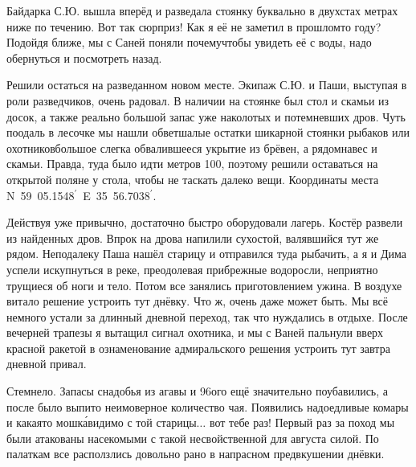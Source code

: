 Байдарка С.Ю. вышла вперёд и разведала стоянку буквально в двухстах метрах ниже по течению. Вот так сюрприз! Как я её не заметил в прошлом\sdash то году? Подойдя ближе, мы с Саней поняли почему\mdash  чтобы увидеть её с воды, надо обернуться и посмотреть назад. 

Решили остаться на разведанном новом месте. Экипаж С.Ю. и Паши, выступая в роли разведчиков, очень радовал. В наличии на стоянке был стол и скамьи из досок, а также реально большой запас уже наколотых и потемневших дров. Чуть поодаль в лесочке мы нашли обветшалые остатки шикарной стоянки рыбаков или охотников\mdash  большое слегка обвалившееся укрытие из брёвен, а рядом\mdash  навес и скамьи. Правда, туда было идти метров 100, поэтому решили оставаться на открытой поляне у стола, чтобы не таскать далеко вещи. Координаты места N~59\degree~05.1548$^\prime$~E~35\degree~56.7038$^\prime$. 

Действуя уже привычно, достаточно быстро оборудовали лагерь. Костёр развели из найденных дров. Впрок на дрова напилили сухостой, валявшийся тут же рядом. Неподалеку Паша нашёл старицу и отправился туда рыбачить, а я и Дима успели искупнуться в реке, преодолевая прибрежные водоросли, неприятно трущиеся об ноги и тело. Потом все занялись приготовлением ужина. В воздухе витало решение устроить тут днёвку. Что ж, очень даже может быть. Мы всё немного устали за длинный дневной переход, так что нуждались в отдыхе. После вечерней трапезы я вытащил сигнал охотника, и мы с Ваней пальнули вверх красной ракетой в ознаменование адмиральского решения устроить тут завтра дневной привал.

Стемнело. Запасы снадобья из агавы и 96\sdash ого ещё значительно поубавились, а после было выпито неимоверное количество чая. Появились надоедливые комары и какая\sdash то мошк\'{а}\mdash  видимо с той старицы$\ldots$ вот тебе раз! Первый раз за поход мы были атакованы насекомыми с такой несвойственной для августа силой. По палаткам все расползлись довольно рано в напрасном предвкушении днёвки. 

\begin{center}
\end{center}
